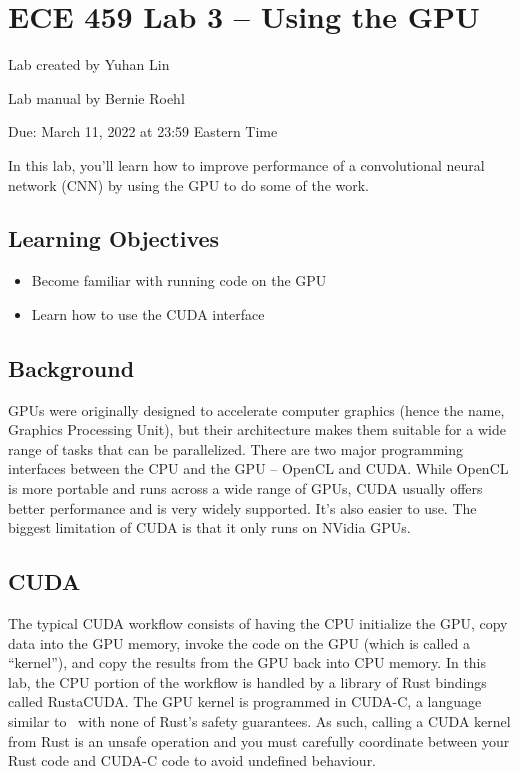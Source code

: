 



\section*{ECE 459 Lab 3 -- Using the GPU}

\begin{center}
Lab created by Yuhan Lin

Lab manual by Bernie Roehl

Due: March 11, 2022 at 23:59 Eastern Time
\end{center}

In this lab, you'll learn how to improve performance of a convolutional neural network (CNN) by using the GPU to do some of the work.


\subsection*{Learning Objectives}

\begin{itemize}
	\item Become familiar with running code on the GPU

	\item Learn how to use the CUDA interface
\end{itemize}

\subsection*{Background}

GPUs were originally designed to accelerate computer graphics (hence the name, Graphics Processing Unit), but their architecture makes them suitable for a wide range of tasks that can be parallelized. There are two major programming interfaces between the CPU and the GPU -- OpenCL and CUDA. While OpenCL is more portable and runs across a wide range of GPUs, CUDA usually offers better performance and is very widely supported. It's also easier to use. The biggest limitation of CUDA is that it only runs on NVidia GPUs.

\subsection*{CUDA}

The typical CUDA workflow consists of having the CPU initialize the GPU, copy data into the GPU memory, invoke the code on the GPU (which is called a ``kernel''), and copy the results from the GPU back into CPU memory. In this lab, the CPU portion of the workflow is handled by a library of Rust bindings called RustaCUDA. The GPU kernel is programmed in CUDA-C, a language similar to \CPP~with none of Rust's safety guarantees. As such, calling a CUDA kernel from Rust is an unsafe operation and you must carefully coordinate between your Rust code and CUDA-C code to avoid undefined behaviour.

